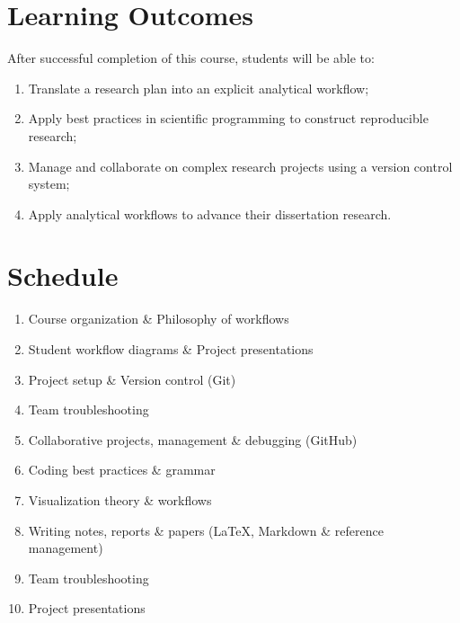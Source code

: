 \documentclass[10pt]{article}
\begin{document}
\section*{Learning Outcomes}
After successful completion of this course, students will be able to:
\begin{enumerate}
	\itemsep0em 
	\item Translate a research plan into an explicit analytical workflow;
	\item Apply best practices in scientific programming to construct reproducible research;
	\item Manage and collaborate on complex research projects using a version control system;
	\item Apply analytical workflows to advance their dissertation research.
\end{enumerate}


\section*{Schedule}
\begin{enumerate}[label=\bfseries Week \arabic*:,leftmargin=*,labelindent=1em]
	\itemsep0em 
	\item Course organization \& Philosophy of workflows
	\item Student workflow diagrams \& Project presentations
	\item Project setup \& Version control (Git)
	\item Team troubleshooting
	\item Collaborative projects, management \& debugging (GitHub)
	\item Coding best practices \& grammar
	\item Visualization theory \& workflows
	\item Writing notes, reports \& papers (\LaTeX, Markdown \& reference management)
	\item Team troubleshooting
	\item Project presentations
\end{enumerate}
\end{document}
